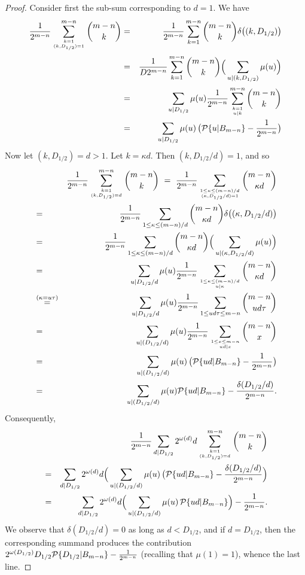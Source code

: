 \documentclass[10pt,a4paper]{amsart}
\def\P{{\mathcal P}}
\def \d{{\delta}}
\def \k{{\kappa}}
\def \m{{\mu}}
\def \o{{\omega}}
\begin{document}
\begin{proof}
 Consider first the sub-sum corresponding to $d=1$. We have  
\begin{eqnarray*}
 {1  \over  2^{  m-n }}
 \sum_{k=1\atop (k, D_{1/2})=1}^{m-n}   {{m-n}\choose {k}}
 &=&
 {1  \over   2^{  m-n }}
 \sum_{k=1}^{m-n}   {{m-n}\choose {k}}\d\big((k, D_{1/2})\big)
 \cr&=& 
 {1  \over D 2^{  m-n }}
 \sum_{k=1}^{m-n}   {{m-n}\choose {k}}\Big(\sum_{u|(k, D_{1/2} )}\m(u)\Big)
\cr&=& 
 \sum_{u|  D_{1/2} }\m(u)
 {1  \over   2^{  m-n }} \sum_{k=1\atop u|k}^{m-n}   {{m-n}\choose {k}}\cr&=& 
 \sum_{u|  D_{1/2} }\m(u)\,\big(\P\{u|B_{m-n}\}-{1  \over  2^{  m-n }}
\big)\end{eqnarray*}
Now let $(k, D_{1/2})=d>1$. Let $k=\k d$.
Then $(k,D_{1/2}/d)=1$, and so
\begin{eqnarray*}
& & {1  \over   2^{  m-n }}
 \sum_{k=1\atop (k, D_{1/2})=d}^{m-n}   {{m-n}\choose {k}}
\ = \ 
 {1  \over   2^{  m-n }}
 \sum_{1\le \k\le (m-n)/d\atop 
 (\k,D_{1/2}/d)=1}     {{m-n}\choose {\k d}}
\cr&=&
 {1  \over   2^{  m-n }}
 \sum_{1\le \k\le (m-n)/d}   {{m-n}\choose {\k d}}\d\big((\k, D_{1/2}/d)\big)
 \cr&=&{1  \over   2^{  m-n }}
 \sum_{1\le \k\le (m-n)/d}   {{m-n}\choose {\k d}}\Big(\sum_{u|(\k, D_{1/2}/d) }\m(u)\Big)
 \cr&=&\sum_{u|  D_{1/2}/d }\m(u)
 {1  \over   2^{  m-n }} \sum_{1\le \k\le (m-n)/d\atop u|\k}   {{m-n}\choose {\k d}}
    \cr &\buildrel{(\k = u\tau)}\over{=}& 
 \sum_{u|  D_{1/2} /d}\m(u)
 {1  \over   2^{  m-n }} \sum_{1\le ud\tau \le  m-n}     {{m-n}\choose {ud\tau}}
 \cr &=&
 \sum_{u|  (D_{1/2}/d ) }\m(u)
 {1  \over   2^{  m-n }} \sum_{1\le x \le  m-n\atop 
 ud|x}    {{m-n}\choose {x}}\cr&=& 
  \sum_{u|  (D_{1/2}/d )}\m(u)\,\big(\P\{ud|B_{m-n}\}-{1  \over  2^{  m-n }}
\big)
  \cr&=&
  \sum_{u|  (D_{1/2}/d )}\m(u) \P\{ud|B_{m-n}\}-{\d(D_{1/2}/d ) \over  2^{  m-n }}.\end{eqnarray*} 
Consequently,
 \begin{eqnarray*}
& &{1  \over  2^{  m-n }}\sum_{d| D_{1/2}} 2^{\o (d)}d
 \sum_{k=1\atop (k, D_{1/2})=d}^{m-n}   {{m-n}\choose {k}}  
\cr &=&
 \sum_{d| D_{1/2}} 2^{\o (d)}d
 \Big(\sum_{u|  (D_{1/2}/d )}\m(u)\,\big(\P\{ud|B_{m-n}\}-{\d(D_{1/2}/d )  \over  2^{  m-n }}\Big)
 \cr &=&
 \sum_{d| D_{1/2} } 2^{\o (d)}d
 \Big(\sum_{u|  (D_{1/2}/d )}\m(u)\, \P\{ud|B_{m-n}\}\Big)-{1  \over  2^{  m-n }} .
 \end{eqnarray*}
We observe   that $\d(D_{1/2}/d ) =0$ as long as $d< D_{1/2}$, and if $d=D_{1/2}$, then the corresponding summand   produces the contribution $2^{\o (D_{1/2})}D_{1/2}   \P\{ D_{1/2}|B_{m-n}\}-{1  \over  2^{  m-n }}$  (recalling that $\m(1)=1$), whence the last line. 

\end{proof}
\end{document}
